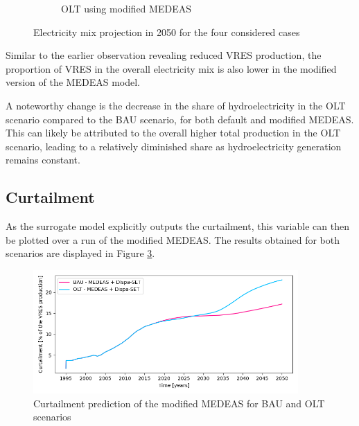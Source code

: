 \begin{figure}[h]
\begin{subfigure}{0.34\textwidth}
        \caption{OLT using modified MEDEAS}
        \label{fig:electricity-mix-OLT-dispa}
    \end{subfigure}
    \caption{Electricity mix projection in 2050 for the four considered cases}
    \label{fig:electricity-mixes}
\end{figure}

Similar to the earlier observation revealing reduced VRES production, the proportion of VRES in the overall electricity mix is also lower in the modified version of the MEDEAS model.

A noteworthy change is the decrease in the share of hydroelectricity in the OLT scenario compared to the BAU scenario, for both default and modified MEDEAS. This can likely be attributed to the overall higher total production in the OLT scenario, leading to a relatively diminished share as hydroelectricity generation remains constant.

\subsection{Curtailment}

As the surrogate model explicitly outputs the curtailment, this variable can then be plotted over a run of the modified MEDEAS. The results obtained for both scenarios are displayed in Figure \ref{fig:electricity-production-curtailed}.

\begin{figure}[h]
    \centering
    \includegraphics[width=0.9\textwidth]{resources/images/electricity-production-curtailed.png}
    \caption{Curtailment prediction of the modified MEDEAS for BAU and OLT scenarios}
    \label{fig:electricity-production-curtailed}
\end{figure}

